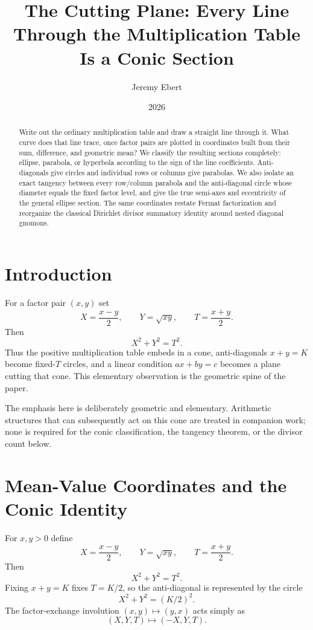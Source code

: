 \documentclass[11pt]{amsart}
\title{The Cutting Plane: Every Line Through the Multiplication Table Is a Conic Section}
\author{Jeremy Ebert}
\date{2026}
\theoremstyle{remark}
\begin{document}
\maketitle

\begin{abstract}
Write out the ordinary multiplication table and draw a straight line through it. What curve does that line trace, once factor pairs are plotted in coordinates built from their sum, difference, and geometric mean? We classify the resulting sections completely: ellipse, parabola, or hyperbola according to the sign of the line coefficients. Anti-diagonals give circles and individual rows or columns give parabolas. We also isolate an exact tangency between every row/column parabola and the anti-diagonal circle whose diameter equals the fixed factor level, and give the true semi-axes and eccentricity of the general ellipse section. The same coordinates restate Fermat factorization and reorganize the classical Dirichlet divisor summatory identity around nested diagonal gnomons.
\end{abstract}

\section{Introduction}
For a factor pair $(x,y)$ set
\[
X=\frac{x-y}{2},\qquad Y=\sqrt{xy},\qquad T=\frac{x+y}{2}.
\]
Then
\[
X^2+Y^2=T^2.
\]
Thus the positive multiplication table embeds in a cone, anti-diagonals $x+y=K$ become fixed-$T$ circles, and a linear condition $ax+by=c$ becomes a plane cutting that cone. This elementary observation is the geometric spine of the paper.

The emphasis here is deliberately geometric and elementary. Arithmetic structures that can subsequently act on this cone are treated in companion work; none is required for the conic classification, the tangency theorem, or the divisor count below.

\section{Mean-Value Coordinates and the Conic Identity}
For $x,y>0$ define
\begin{equation}
X=\frac{x-y}2,\qquad Y=\sqrt{xy},\qquad T=\frac{x+y}2. \tag{2.1}
\end{equation}
Then
\begin{equation}
X^2+Y^2=T^2. \tag{2.2}
\end{equation}
Fixing $x+y=K$ fixes $T=K/2$, so the anti-diagonal is represented by the circle
\[
X^2+Y^2=(K/2)^2.
\]
The factor-exchange involution $(x,y)\mapsto(y,x)$ acts simply as
\[
(X,Y,T)\mapsto(-X,Y,T).
\]
\end{document}
